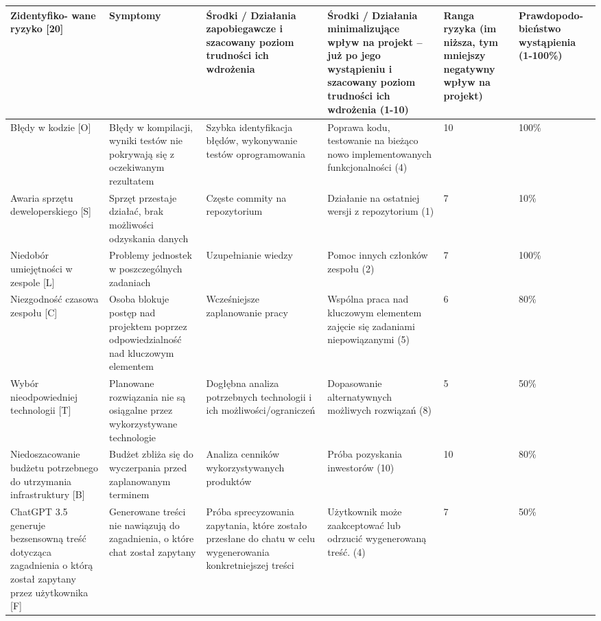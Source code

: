 \begin{longtable}{|p{2.3cm}|p{2.3cm}|p{2.3cm}|p{2.3cm}|p{2.3cm}|p{2.3cm}|}
    \hline
\textbf{Zidentyfiko- wane ryzyko [20]} & \textbf{Symptomy} & \textbf{Środki / Działania zapobiegawcze i szacowany poziom trudności ich wdrożenia} & \textbf{Środki / Działania minimalizujące wpływ na projekt – już po jego wystąpieniu i szacowany poziom trudności ich wdrożenia (1-10)} & \textbf{Ranga ryzyka (im niższa, tym mniejszy negatywny wpływ na projekt)} & \textbf{Prawdopodo- bieństwo wystąpienia (1-100\%)} \\
\hline
Błędy w kodzie [O] & Błędy w kompilacji, wyniki testów nie pokrywają się z oczekiwanym rezultatem  & Szybka identyfikacja błędów, wykonywanie testów oprogramowania & Poprawa kodu, testowanie na bieżąco nowo implementowanych funkcjonalności (4) & 10 & 100\% \\
\hline
Awaria sprzętu deweloperskiego [S] & Sprzęt przestaje działać, brak możliwości odzyskania danych & Częste commity na repozytorium & Działanie na ostatniej wersji z repozytorium (1) & 7 & 10\% \\
\hline
Niedobór umiejętności w zespole [L] & Problemy jednostek w poszczególnych zadaniach & Uzupełnianie wiedzy & Pomoc innych członków zespołu (2) & 7 & 100\% \\
\hline
Niezgodność czasowa zespołu [C]  & Osoba blokuje postęp nad projektem poprzez odpowiedzialność nad kluczowym elementem & Wcześniejsze zaplanowanie pracy & Wspólna praca nad kluczowym elementem zajęcie się zadaniami niepowiązanymi (5) & 6 & 80\% \\
\hline
Wybór nieodpowiedniej technologii [T] & Planowane rozwiązania nie są osiągalne przez wykorzystywane technologie & Dogłębna analiza potrzebnych technologii i ich możliwości/ograniczeń & Dopasowanie alternatywnych możliwych rozwiązań (8) & 5 & 50\% \\
\hline
Niedoszacowanie budżetu potrzebnego do utrzymania infrastruktury [B] & Budżet zbliża się do wyczerpania przed zaplanowanym terminem  & Analiza cenników wykorzystywanych produktów & Próba pozyskania inwestorów (10) & 10 & 80\% \\
\hline
ChatGPT 3.5 generuje bezsensowną treść dotycząca zagadnienia o którą został zapytany przez użytkownika [F] & Generowane treści nie nawiązują do zagadnienia, o które chat został zapytany & Próba sprecyzowania zapytania, które zostało przesłane do chatu w celu wygenerowania konkretniejszej treści & Użytkownik może zaakceptować lub odrzucić wygenerowaną treść.  (4) & 7 & 50\% \\
\hline
\end{longtable}
